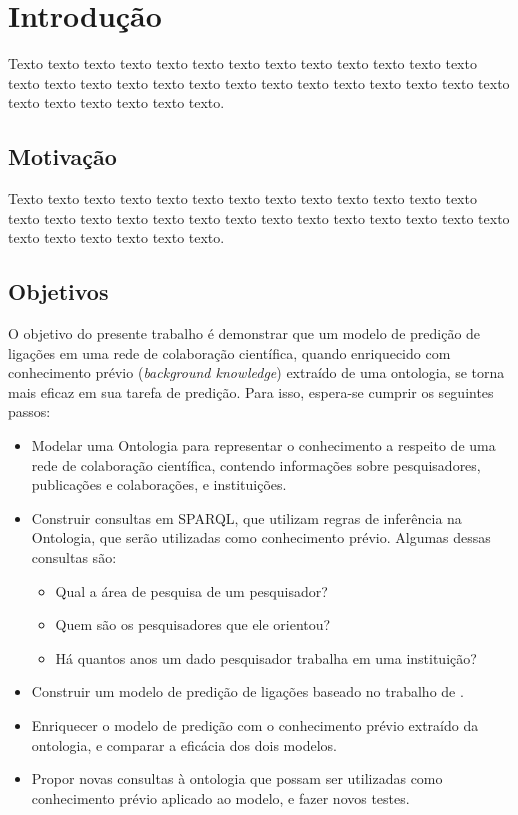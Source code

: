 \chapter{Introdução}
\label{cap:introducao}

Texto texto texto texto texto texto texto texto texto texto texto texto texto
texto texto texto texto texto texto texto texto texto texto texto texto texto
texto texto texto texto texto texto texto.



\section{Motivação}
\label{sec:motivacao}

Texto texto texto texto texto texto texto texto texto texto texto texto texto
texto texto texto texto texto texto texto texto texto texto texto texto texto
texto texto texto texto texto texto texto.


\section{Objetivos}
\label{sec:objetivos}

O objetivo do presente trabalho é demonstrar que um modelo de predição de ligações em uma rede de colaboração científica, quando enriquecido com conhecimento prévio (\textit{background knowledge}) extraído de uma ontologia, se torna mais eficaz em sua tarefa de predição.
Para isso, espera-se cumprir os seguintes passos:

\begin{itemize}
    \item Modelar uma Ontologia para representar o conhecimento a respeito de uma rede de colaboração científica, contendo informações sobre pesquisadores, publicações e colaborações, e instituições.
    \item Construir consultas em SPARQL, que utilizam regras de inferência na Ontologia, que serão utilizadas como conhecimento prévio. Algumas dessas consultas são:
    \begin{itemize}
        \item Qual a área de pesquisa de um pesquisador?
        \item Quem são os pesquisadores que  ele orientou?
        \item Há quantos anos um dado pesquisador trabalha em uma instituição?
    \end{itemize}
    \item Construir um modelo de predição de ligações baseado no trabalho de \citet{Cervantes2014}.
    \item Enriquecer o modelo de predição com o conhecimento prévio extraído da ontologia, e comparar a eficácia dos dois modelos.
    \item Propor novas consultas à ontologia que possam ser utilizadas como conhecimento prévio aplicado ao modelo, e fazer novos testes.
\end{itemize}

